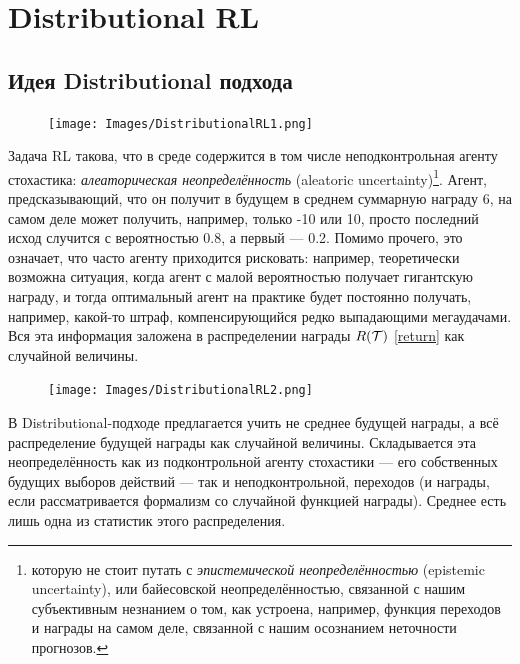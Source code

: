 \section{Distributional RL}

\subsection{Идея Distributional подхода}

\begin{figure}
\vspace{-0.3cm}
\centering
\texttt{[image: Images/DistributionalRL1.png]}
\vspace{-0.6cm}
\end{figure}

Задача RL такова, что в среде содержится в том числе неподконтрольная агенту стохастика: \emph{алеаторическая неопределённость} (aleatoric uncertainty)\footnote{которую не стоит путать с \emph{эпистемической неопределённостью} (epistemic uncertainty), или байесовской неопределённостью, связанной с нашим субъективным незнанием о том, как устроена, например, функция переходов и награды на самом деле, связанной с нашим осознанием неточности прогнозов.}. Агент, предсказывающий, что он получит в будущем в среднем суммарную награду 6, на самом деле может получить, например, только -10 или 10, просто последний исход случится с вероятностью 0.8, а первый --- 0.2. Помимо прочего, это означает, что часто агенту приходится рисковать: например, теоретически возможна ситуация, когда агент с малой вероятностью получает гигантскую награду, и тогда оптимальный агент на практике будет постоянно получать, например, какой-то штраф, компенсирующийся редко выпадающими мегаудачами. Вся эта информация заложена в распределении награды $R(\mathcal{T})$ \eqref{return} как случайной величины.

\begin{figure}
\vspace{-0.3cm}
\centering
\texttt{[image: Images/DistributionalRL2.png]}
\vspace{-0.3cm}
\end{figure}

В Distributional-подходе предлагается учить не среднее будущей награды, а всё распределение будущей награды как случайной величины. Складывается эта неопределённость как из подконтрольной агенту стохастики --- его собственных будущих выборов действий --- так и неподконтрольной, переходов (и награды, если рассматривается формализм со случайной функцией награды). Среднее есть лишь одна из статистик этого распределения. 

